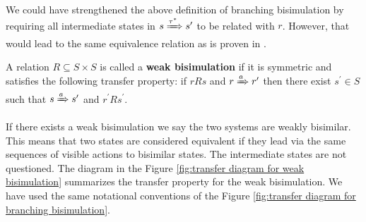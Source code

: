 We could have strengthened the above definition of branching bisimulation by requiring all intermediate states in $s\xRightarrow{\tau^*}s^\prime$ to be related with $r$. However, that would lead to the same equivalence relation as is proven in \cite{DeNicola95Bisimulations}. 

\begin{definition}
  A relation $R\subseteq S\times S$ is called a  {\bf weak bisimulation} if it is symmetric and satisfies the following transfer property: if $rRs$ and $r\xRightarrow{a} r^\prime$ then there exist $s^\prime\in S$ such that $s \xRightarrow{a} s^\prime$ and $r^\prime Rs^{\prime}$.
\end{definition}

If there exists a weak bisimulation we say the two systems are weakly bisimilar.
This means that two states are considered equivalent if they lead via the same sequences of visible actions to bisimilar states. The intermediate states are not questioned. The diagram in the Figure \ref{fig:transfer diagram for weak bisimulation} summarizes the transfer property for the weak bisimulation. We have used the same notational conventions of the Figure \ref{fig:transfer diagram for branching bisimulation}.

